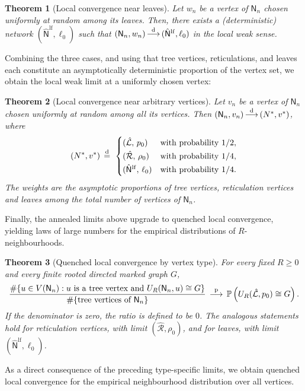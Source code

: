 \documentclass[english,11pt]{smfart}
\newcommand{\Prb}[1]{\mathbb{P}\left(#1\right)}
\newcommand{\convdis}{\,{\buildrel \mathrm{d} \over \longrightarrow}\,}
\newcommand{\convp}{\,{\buildrel \mathrm{p} \over \longrightarrow}\,}
\newcommand{\eqdist}{\,{\buildrel \mathrm{d} \over =}\,}
\newcommand{\cL}{\mathcal{L}}
\newcommand{\cR}{\mathcal{R}}
\newcommand{\mN}{\mathsf{N}}
\newtheorem{theorem}{Theorem}[section]
\numberwithin{equation}{section}
\begin{document}
\begin{theorem}[Local convergence near leaves]\label{te:loc-leaf}
Let $w_n$ be a vertex of $\mN_n$ chosen uniformly at random among its leaves.
Then, there exists a (deterministic) network $(\hat{\mN}^{\mathrm{lf}},\ell_0)$ such that $(\mN_n,w_n)\convdis(\hat{\mN}^{\mathrm{lf}},\ell_0)$ in the local weak
sense.
\end{theorem}

Combining the three cases, and using that tree vertices, reticulations,
and leaves each constitute an asymptotically deterministic proportion of the vertex set, we obtain the local weak limit at a uniformly chosen vertex:

\begin{theorem}[Local convergence near arbitrary vertices]\label{te:loc-vertex}Let $v_n$ be a vertex of $\mN_n$ chosen uniformly at random among all its vertices. Then $(\mN_n,v_n)\convdis(N^*,v^*)$, where
\[
  (N^*,v^*)\;\eqdist\;\begin{cases}
    (\hat{\cL},\,p_0) & \text{with probability } 1/2,\\[2pt]
    (\hat{\cR},\,\rho_0) & \text{with probability } 1/4,\\[2pt]
    (\hat{\mN}^{\mathrm{lf}},\,\ell_0) & \text{with probability } 1/4.
  \end{cases}
\]
The weights are the asymptotic proportions of  tree vertices, reticulation vertices and leaves among the total number of vertices of $\mN_n$.
\end{theorem}

Finally, the annealed limits above upgrade to quenched local convergence,
yielding laws of large numbers for the empirical distributions of
\(R\)-neighbourhoods.

\begin{theorem}[Quenched local convergence by vertex type]
\label{te:loc-quenched}
For every fixed \(R\ge0\) and every finite rooted directed marked graph
\(G\),
\[
  \frac{
    \#\{u\in V(\mN_n):
    u\text{ is a tree vertex and }U_R(\mN_n,u)\cong G\}
  }{
    \#\{\text{tree vertices of }\mN_n\}
  }
  \;\convp\;
  \Prb{U_R(\hat{\cL},p_0)\cong G}.
\]
If the denominator is zero, the ratio is defined to be \(0\).
The analogous statements hold for reticulation vertices, with limit
\((\hat{\cR},\rho_0)\), and for leaves, with limit
\((\hat{\mN}^{\mathrm{lf}},\ell_0)\).
\end{theorem}

As a direct consequence of the preceding type-specific limits, we obtain
quenched local convergence for the empirical neighbourhood distribution
over all vertices.
\end{document}
